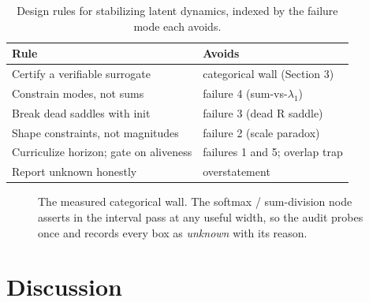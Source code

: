 \documentclass[11pt]{article}
\begin{document}
\begin{table}[t]
\centering
\caption{Design rules for stabilizing latent dynamics, indexed by the
failure mode each avoids.}
\label{tab:rules}
\small
\begin{tabular}{@{}ll@{}}
\toprule
Rule & Avoids \\
\midrule
Certify a verifiable surrogate & categorical wall (Section 3) \\
Constrain modes, not sums & failure 4 (sum-vs-$\lambda_1$) \\
Break dead saddles with init & failure 3 (dead R saddle) \\
Shape constraints, not magnitudes & failure 2 (scale paradox) \\
Curriculize horizon; gate on aliveness & failures 1 and 5; overlap trap \\
Report unknown honestly & overstatement \\
\bottomrule
\end{tabular}
\end{table}

\begin{figure}[t]
\centering
{}
\caption{The measured categorical wall. The softmax / sum-division node
asserts in the interval pass at any useful width, so the audit probes once
and records every box as \emph{unknown} with its reason.}
\label{fig:wall}
\end{figure}

\section{Discussion}
\end{document}
